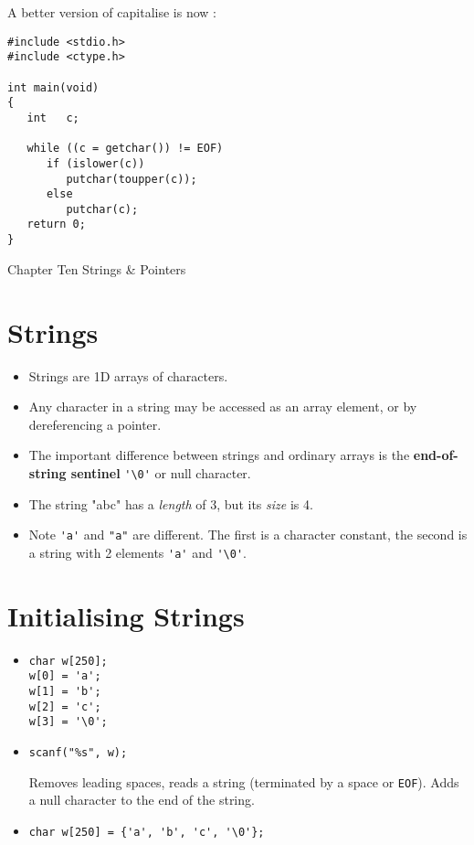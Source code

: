\newpage
A better version of capitalise is now :

\begin{verbatim}
#include <stdio.h>
#include <ctype.h>

int main(void)
{
   int   c;

   while ((c = getchar()) != EOF)
      if (islower(c))
         putchar(toupper(c));
      else
         putchar(c);
   return 0;
}
\end{verbatim}

\newpage
\begin{center}
{\Large Chapter Ten Strings \& Pointers}
\end{center}
\vspace{-0.5in}
\section*{Strings}
\begin{itemize}
\item Strings are 1D arrays of characters.
\item Any character in a string may be accessed as an array
element, or by dereferencing a pointer.
\item The important difference between strings and ordinary arrays
is the {\bf end-of-string sentinel} \verb^'\0'^ or null character.
\end{itemize}

\newpage
\begin{itemize}
\item The string "abc" has a {\it length} of 3, but its {\it size} is 4.
\item Note \verb^'a'^ and \verb^"a"^ are different. The first is a
character constant, the second is a string with 2 elements
\verb^'a'^ and \verb^'\0'^.
\end{itemize}

\newpage
\section*{Initialising Strings}
\begin{itemize}
\item \begin{verbatim}
char w[250];
w[0] = 'a';
w[1] = 'b';
w[2] = 'c';
w[3] = '\0';
\end{verbatim}
\item \begin{verbatim}
scanf("%s", w);
\end{verbatim}
Removes leading spaces, reads a string (terminated by a
space or \verb^EOF^). Adds a null character to the end
of the string.
\item \begin{verbatim}
char w[250] = {'a', 'b', 'c', '\0'};
\end{verbatim}
\end{itemize}

